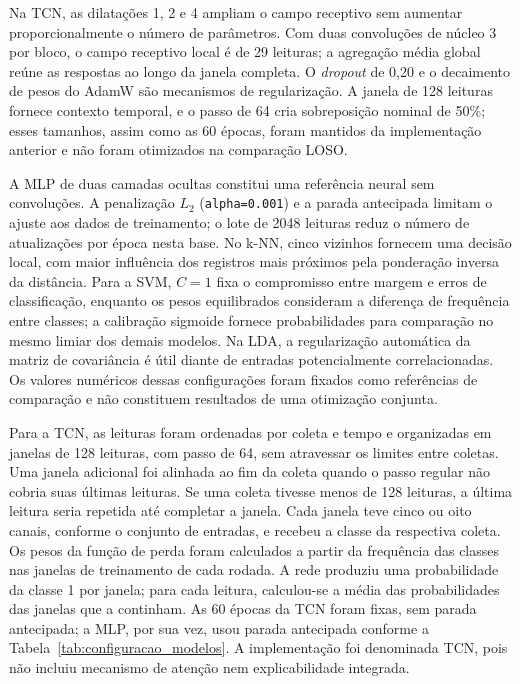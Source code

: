 Na TCN, as dilatações 1, 2 e 4 ampliam o campo receptivo sem aumentar
proporcionalmente o número de parâmetros. Com duas convoluções de núcleo
3 por bloco, o campo receptivo local é de 29 leituras; a agregação média
global reúne as respostas ao longo da janela completa. O \emph{dropout}
de 0,20 e o decaimento de pesos do AdamW são mecanismos de regularização.
A janela de 128 leituras fornece contexto temporal, e o passo de 64 cria
sobreposição nominal de 50\%; esses tamanhos, assim como as 60 épocas,
foram mantidos da implementação anterior e não foram otimizados na
comparação LOSO.

A MLP de duas camadas ocultas constitui uma referência neural sem
convoluções. A penalização $L_2$ (\texttt{alpha=0.001}) e a parada
antecipada limitam o ajuste aos dados de treinamento; o lote de 2048
leituras reduz o número de atualizações por época nesta base. No k-NN,
cinco vizinhos fornecem uma decisão local, com maior influência dos
registros mais próximos pela ponderação inversa da distância. Para a SVM,
$C=1$ fixa o compromisso entre margem e erros de classificação, enquanto
os pesos equilibrados consideram a diferença de frequência entre classes;
a calibração sigmoide fornece probabilidades para comparação no mesmo
limiar dos demais modelos. Na LDA, a regularização automática da matriz
de covariância é útil diante de entradas potencialmente correlacionadas.
Os valores numéricos dessas configurações foram fixados como referências
de comparação e não constituem resultados de uma otimização conjunta.

Para a TCN, as leituras foram ordenadas por coleta e tempo e organizadas em
janelas de 128 leituras, com passo de 64, sem atravessar os limites entre
coletas. Uma janela adicional foi alinhada ao fim da coleta quando o passo
regular não cobria suas últimas leituras. Se uma coleta tivesse menos de
128 leituras, a última leitura seria repetida até completar a janela.
Cada janela teve cinco ou oito canais, conforme o conjunto de entradas, e
recebeu a classe da respectiva coleta. Os pesos da função de perda foram
calculados a partir da frequência das classes nas janelas de treinamento
de cada rodada. A rede produziu uma probabilidade da classe 1 por janela;
para cada leitura, calculou-se a média das probabilidades das janelas que
a continham. As 60 épocas da TCN foram fixas, sem parada antecipada; a
MLP, por sua vez, usou parada antecipada conforme a
Tabela~\ref{tab:configuracao_modelos}. A implementação foi denominada TCN,
pois não incluiu mecanismo de atenção nem explicabilidade integrada.

